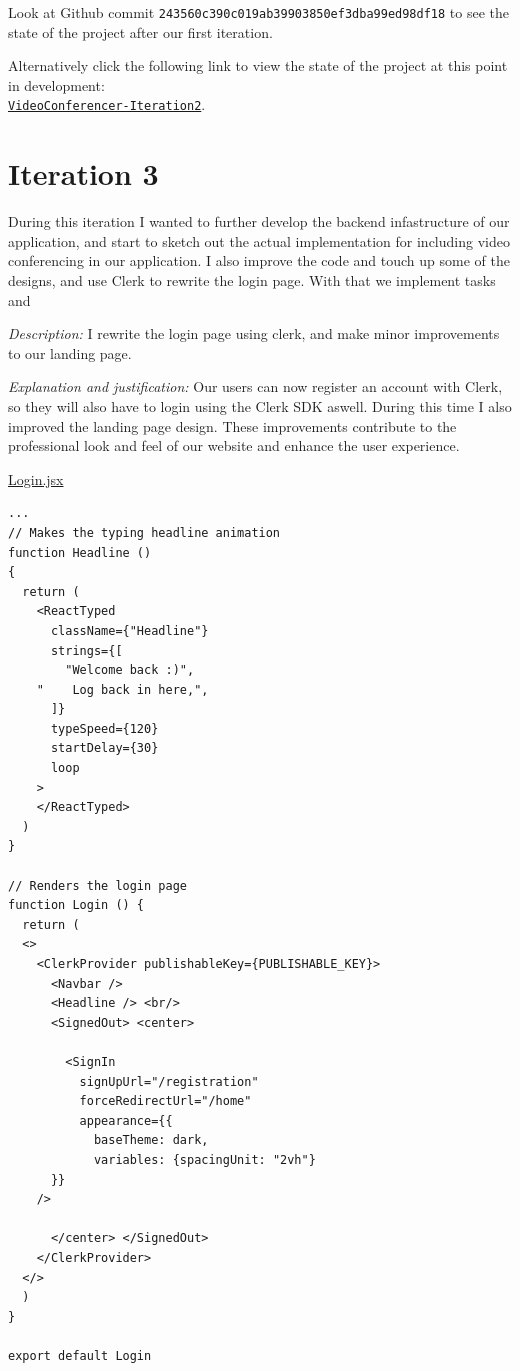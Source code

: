Look at Github commit \texttt{243560c390c019ab39903850ef3dba99ed98df18} to see the state of the project after our first
iteration. \\ \vspace{0.2cm}

Alternatively click the following link to view the state of
the project at this point in development: \\
\href{https://github.com/zzzNathan/Video-Conferencer/tree/243560c390c019ab39903850ef3dba99ed98df18}{
\texttt{VideoConferencer-Iteration2}}.

\newpage

\section{Iteration 3}

During this iteration I wanted to further develop the backend
infastructure of our application, and start to sketch out the
actual implementation for including video conferencing in our
application. I also improve the code and touch up some of the
designs, and use Clerk to rewrite the login page. With that
we implement tasks  and  \\ \vspace{0.2cm}

\textit{Description:} I rewrite the login page using clerk,
and make minor improvements to our landing page. \\
\vspace{0.2cm}

\textit{Explanation and justification:} Our users can now
register an account with Clerk, so they will also have to
login using the Clerk SDK aswell. During this time I also
improved the landing page design. These improvements
contribute to the professional look and feel of our website
and enhance the user experience. \\ \vspace{0.2cm}

\underline{Login.jsx}

\begin{verbatim}
...
// Makes the typing headline animation
function Headline ()
{
  return (
    <ReactTyped
      className={"Headline"}
      strings={[
        "Welcome back :)",
	"    Log back in here,",
      ]}
      typeSpeed={120}
      startDelay={30}
      loop
    >
    </ReactTyped>
  )
}

// Renders the login page
function Login () {
  return (
  <>
    <ClerkProvider publishableKey={PUBLISHABLE_KEY}>
      <Navbar />
      <Headline /> <br/>
      <SignedOut> <center>

        <SignIn
          signUpUrl="/registration"
          forceRedirectUrl="/home"
          appearance={{
            baseTheme: dark,
            variables: {spacingUnit: "2vh"}
	  }}
	/>

      </center> </SignedOut>
    </ClerkProvider>
  </>
  )
}

export default Login
\end{verbatim}

